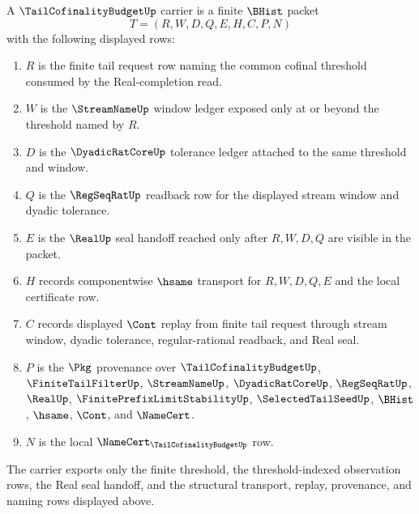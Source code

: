 \begin{definition}
\label{def:tail-cofinality-budget-carrier}
A $\TailCofinalityBudgetUp$ carrier is a finite $\BHist$ packet
$$
T=(R,W,D,Q,E,H,C,P,N)
$$
with the following displayed rows:
\begin{enumerate}
\item $R$ is the finite tail request row naming the common cofinal threshold consumed by the Real-completion read.
\item $W$ is the $\StreamNameUp$ window ledger exposed only at or beyond the threshold named by $R$.
\item $D$ is the $\DyadicRatCoreUp$ tolerance ledger attached to the same threshold and window.
\item $Q$ is the $\RegSeqRatUp$ readback row for the displayed stream window and dyadic tolerance.
\item $E$ is the $\RealUp$ seal handoff reached only after $R,W,D,Q$ are visible in the packet.
\item $H$ records componentwise $\hsame$ transport for $R,W,D,Q,E$ and the local certificate row.
\item $C$ records displayed $\Cont$ replay from finite tail request through stream window, dyadic tolerance, regular-rational readback, and Real seal.
\item $P$ is the $\Pkg$ provenance over $\TailCofinalityBudgetUp$, $\FiniteTailFilterUp$, $\StreamNameUp$, $\DyadicRatCoreUp$, $\RegSeqRatUp$, $\RealUp$, $\FinitePrefixLimitStabilityUp$, $\SelectedTailSeedUp$, $\BHist$, $\hsame$, $\Cont$, and $\NameCert$.
\item $N$ is the local $\NameCert_{\TailCofinalityBudgetUp}$ row.
\end{enumerate}
The carrier exports only the finite threshold, the threshold-indexed observation rows, the Real seal handoff, and the structural transport, replay, provenance, and naming rows displayed above.
\end{definition}

